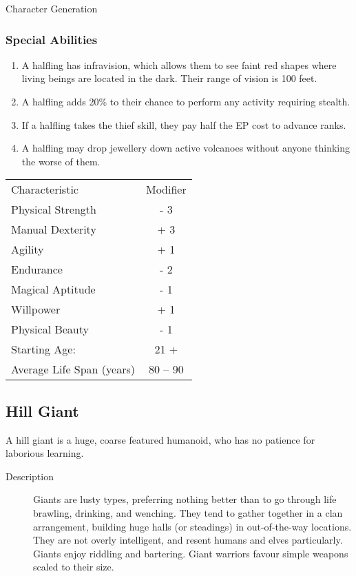\begin{Chapter}{Character Generation}
\subsubsection{Special Abilities}

\begin{enumerate}
\item A halfling has infravision, which allows them to see faint red
  shapes where living beings are located in the dark. Their range of
  vision is 100 feet.

\item A halfling adds 20\% to their chance to perform any activity
  requiring stealth.

\item If a halfling takes the thief skill, they pay half the EP cost
  to advance ranks.

\item A halfling may drop jewellery down active volcanoes without
  anyone thinking the worse of them.
\end{enumerate}

\begin{tabularx}{\columnwidth}{Xc}
Characteristic			& Modifier \\
Physical Strength		& - 3 \\
Manual Dexterity		& + 3 \\
Agility				& + 1 \\
Endurance			& - 2 \\
Magical Aptitude		& - 1 \\
Willpower			& + 1 \\
Physical Beauty			& - 1 \\
Starting Age:			& 21 + \\
Average Life Span (years)	& 80 -- 90 \\
\end{tabularx}

\subsection{Hill Giant}

A hill giant is a huge, coarse featured humanoid, who has no patience
for laborious learning.

\begin{description}
\item[Description] Giants are lusty types, preferring nothing better
  than to go through life brawling, drinking, and wenching.  They tend
  to gather together in a clan arrangement, building huge halls (or
  steadings) in out-of-the-way locations.  They are not overly
  intelligent, and resent humans and elves particularly.  Giants enjoy
  riddling and bartering.  Giant warriors favour simple weapons scaled
  to their size.
\end{description}


\end{Chapter}
